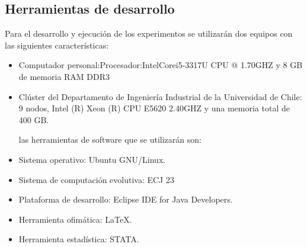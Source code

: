 \subsection{Herramientas de desarrollo}


Para el desarrollo y ejecución de los experimentos se utilizarán dos equipos con las siguientes características:
\begin{itemize}

\item Computador personal:Procesador:Intel\textregistered Core\texttrademark i5-3317U CPU @ 1.70GHZ y 8 GB de memoria RAM DDR3
\item Clúster del Departamento de Ingeniería Industrial de la Universidad de Chile: 9 nodos, Intel (R) Xeon (R) CPU E5620 2.40GHZ y una memoria total de 400 GB.

las herramientas de software que se utilizarán son:
\item Sistema operativo: Ubuntu GNU/Linux.
\item Sistema de computación evolutiva: ECJ 23
\item Plataforma de desarrollo: Eclipse IDE for Java Developers.
\item Herramienta ofimática: \LaTeX.
\item Herramienta estadística: STATA.

\end{itemize}


